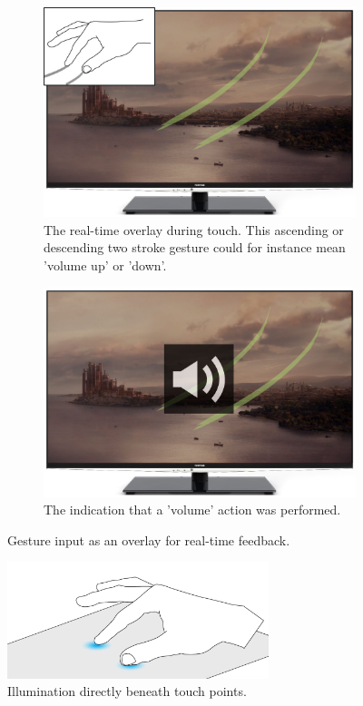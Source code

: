 \begin{figure}[h]
  \centering
  \begin{subfigure}[t]{.45\textwidth}
    \centering
    \includegraphics[width=.9\linewidth]{figures/touch/evaluation/gesture_overlay}
    \caption{The real-time overlay during touch. This ascending or descending two stroke gesture could for instance mean 'volume up' or 'down'.}
  \end{subfigure}%
  \hspace{1cm}
  \begin{subfigure}[t]{.45\textwidth}
    \centering
    \includegraphics[width=.9\linewidth]{figures/touch/evaluation/gesture_overlay_2}
    \caption{The indication that a 'volume' action was performed.}
  \end{subfigure}
  \caption{Gesture input as an overlay for real-time feedback.}
  \label{fig:textiletouch:eval:overlay}
\end{figure}

\begin{figure}[h]
  \centering
      \includegraphics[width=3in]{figures/touch/evaluation/backlid_textile}
  \caption[Illumination directly beneath touch points.]
  {Illumination directly beneath touch points.}
  \label{fig:textiletouch:eval:backlighting}
\end{figure}


